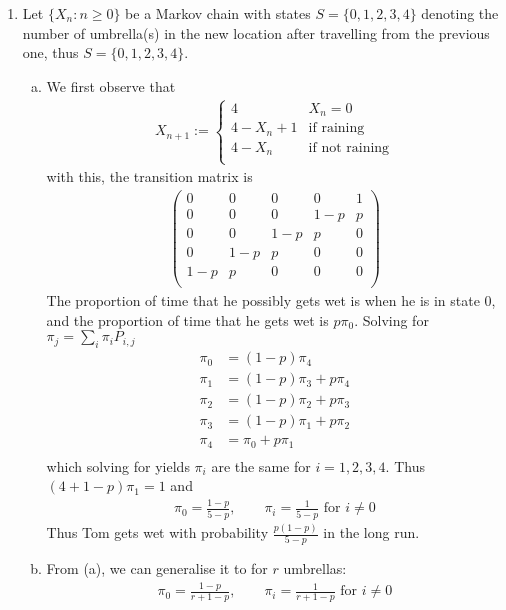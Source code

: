 \documentclass[a4paper,10pt]{article}
\theoremstyle{definition}
\begin{document}
\begin{enumerate}
\item Let $\{X_n:n\geq 0\}$ be a Markov chain with states $S=\{0,1,2,3,4\}$ denoting the number of umbrella(s) in the new location after travelling from the previous one, thus $S = \{0,1,2,3,4\}$.
\begin{enumerate}[(a)]
\item We first observe that
\begin{align*}
X_{n+1}:=\begin{cases}
4 & X_n=0\\
4 - X_n + 1 & \text{if raining}\\
4 - X_n & \text{if not raining}\\
\end{cases}
\end{align*}
with this, the transition matrix is
\begin{align*}
\begin{pmatrix}
0& 0 &0 &0 & 1\\
 0 & 0 &0  &1-p  & p \\
 0 & 0 & 1-p &p  &0  \\
 0 & 1-p & p & 0 &  0\\  
 1-p & p & 0 &  0&  0\\  
\end{pmatrix}
\end{align*}
The proportion of time that he possibly gets wet is when he is in state 0, and the proportion of time that he gets wet is $p\pi_0$. Solving for $\pi_j=\sum_{i}\pi_iP_{i,j}$
\begin{align*}
\pi_0 &= (1-p)\pi_4\\ 
\pi_1 &= (1-p)\pi_3+p\pi_4\\ 
\pi_2 &= (1-p)\pi_2+p\pi_3\\ 
\pi_3 &= (1-p)\pi_1+p\pi_2\\ 
\pi_4 &= \pi_0+p\pi_1\\  
\end{align*}
which solving for yields $\pi_i$ are the same for $i=1,2,3,4$. Thus $(4+1-p)\pi_1=1
$ and 
\begin{align*}
\pi_0=\frac{1-p}{5-p}, \qquad \pi_i=\frac{1}{5-p} \text{ for } i \neq 0
\end{align*}
Thus Tom gets wet with probability $\frac{p(1-p)}{5-p}$ in the long run.
\item From (a), we can generalise it to for $r$ umbrellas:
\begin{align*}
\pi_0=\frac{1-p}{r+1-p}, \qquad \pi_i=\frac{1}{r+1-p} \text{ for } i \neq 0
\end{align*}

\end{enumerate}
\end{enumerate}
\end{document}
